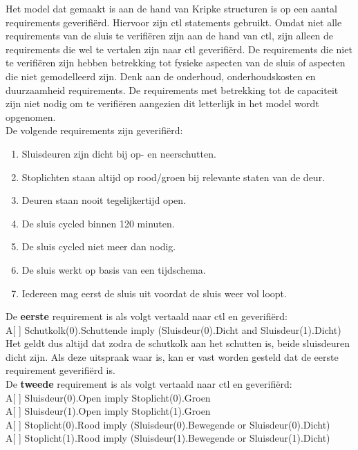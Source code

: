 \documentclass[../verslag.tex]{subfiles}
\begin{document}
Het  model dat gemaakt is aan de hand van Kripke structuren is op een aantal requirements geverifiërd.
Hiervoor zijn ctl statements gebruikt.
Omdat niet alle requirements van de sluis te verifiëren zijn aan de hand van ctl, zijn alleen de requirements die wel te vertalen zijn naar ctl geverifiërd.
De requirements die niet te verifiëren zijn hebben betrekking tot fysieke aspecten van de sluis of aspecten die niet gemodelleerd zijn.
Denk aan de onderhoud, onderhoudskosten en duurzaamheid requirements. 
De requirements met betrekking tot de capaciteit zijn niet nodig om te verifiëren aangezien dit letterlijk in het model wordt opgenomen. \\
De volgende requirements zijn geverifiërd:
\begin{enumerate}
    \item Sluisdeuren zijn dicht bij op- en neerschutten.
    \item Stoplichten staan altijd op rood/groen bij relevante staten van de deur.
    \item Deuren staan nooit tegelijkertijd open.  
    \item De sluis cycled binnen 120 minuten.
    \item De sluis cycled niet meer dan nodig.
    \item De sluis werkt op basis van een tijdschema.
    \item Iedereen mag eerst de sluis uit voordat de sluis weer vol loopt.
\end{enumerate}

De \textbf{eerste} requirement is als volgt vertaald naar ctl en geverifiërd: \\
A[ ] Schutkolk(0).Schuttende imply (Sluisdeur(0).Dicht and Sluisdeur(1).Dicht) \\

Het geldt dus altijd dat zodra de schutkolk aan het schutten is, beide sluisdeuren dicht zijn.
Als deze uitspraak waar is, kan er vast worden gesteld dat de eerste requirement geverifiërd is. \\

De \textbf{tweede} requirement is als volgt vertaald naar ctl en geverifiërd: \\
A[ ] Sluisdeur(0).Open imply Stoplicht(0).Groen \\
A[ ] Sluisdeur(1).Open imply Stoplicht(1).Groen \\
A[ ] Stoplicht(0).Rood imply (Sluisdeur(0).Bewegende or Sluisdeur(0).Dicht) \\
A[ ] Stoplicht(1).Rood imply (Sluisdeur(1).Bewegende or Sluisdeur(1).Dicht) \\
\end{document}
